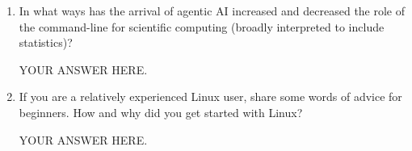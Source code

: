 \documentclass[12pt]{article}
\begin{document}
\begin{enumerate}
Report briefly on which activity you chose and what you have learned.

YOUR ANSWER HERE.


\item In what ways has the arrival of agentic AI increased and decreased the role of the command-line for scientific computing (broadly interpreted to include statistics)?

YOUR ANSWER HERE.

\item If you are a relatively experienced Linux user, share some words of advice for beginners. How and why did you get started with Linux?  

YOUR ANSWER HERE.

\end{enumerate}
\end{document}
